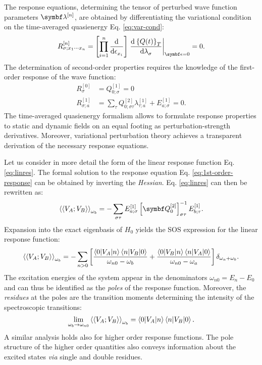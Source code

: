 The response equations, determining the tensor of
perturbed wave function parameters $\vect{\lambda}^{[n]}$, are obtained by differentiating the
variational condition on the time-averaged quasienergy Eq.
\eqref{eq:var-cond}:\autocite{Olsen1985-nr, Helgaker1992-ph, Christiansen1998-pe}
\begin{equation}
 R_{\sigma;x_1\cdots x_n}^{[n]} = \left[\prod_{i=1}^n \deriv{}{\epsilon_{x_i}}\right]
\left. \deriv{\aveQ}{\lambda_\sigma}\right|_{\vect{\epsilon}=0} = 0.
\end{equation}
The determination of second-order properties requires the knowledge of
the first-order response of the wave function:
\begin{subequations}
 \begin{align}
 R_{\sigma}^{[0]} &= Q_{0;\sigma}^{[1]} = 0 \\
 R_{\sigma;a}^{[1]} &= \sum_{\tau}Q_{0;\sigma\tau}^{[2]}\lambda_{\tau;a}^{[1]} + E_{a;\sigma}^{[1]} = 0.
 \label{eq:1st-order-response}
 \end{align}
\end{subequations}
The time-averaged quasienergy formalism allows to formulate response
properties to static and dynamic fields on an equal footing as
perturbation-strength derivatives.
Moreover, variational perturbation theory achieves a transparent
derivation of the necessary response equations.\autocite{Helgaker1992-ph}

Let us consider in more detail the form of the linear response function
Eq. \eqref{eq:linres}. The formal solution to the response equation Eq.
\eqref{eq:1st-order-response} can be obtained by inverting the
\emph{Hessian}. Eq. \eqref{eq:linres} can then be rewritten as:
\begin{equation}
  \response{V_A}{V_B}{\omega_b}
  =
   -\sum_{\sigma\tau}
   E^{[1]}_{a;\sigma}
   \left[\mat{Q}^{[2]}_{0}\right]^{-1}_{\sigma\tau}
   E^{[1]}_{b;\tau}.
\end{equation}
Expansion into the exact eigenbasis of $H_0$ yields the
\gls{SOS} expression for the linear response function:
\begin{equation}
  \Braket{\Braket{V_A; V_B}}_{\omega_b}
  =
  -\sum_{n>0}\left[
  \frac{\braket{0|V_A|n}\braket{n|V_B|0}}{\omega_{n0}-\omega_b}
  +
  \frac{\braket{0|V_B|n}\braket{n|V_A|0}}{\omega_{n0}-\omega_a}
  \right]\delta_{\omega_a+\omega_b}.
\end{equation}
The excitation energies of the system appear in the denominators
$\omega_{n0} = E_n - E_0$ and can thus be identified as the \emph{poles}
of the response function. Moreover, the \emph{residues} at
the poles are the transition moments determining the intensity of
the spectroscopic transitions:
\begin{equation}
  \lim_{\omega_b\rightarrow\omega_{n0}}
  \Braket{\Braket{V_A; V_B}}_{\omega_b}
  = \braket{0|V_A|n}\braket{n|V_B|0}.
\end{equation}
A similar analysis holds also for higher order response functions. The
pole structure of the higher order quantities also conveys information
about the excited states \emph{via} single and double
residues.\autocite{Olsen1985-nr, Christiansen1998-pe, Helgaker2012-cz}

